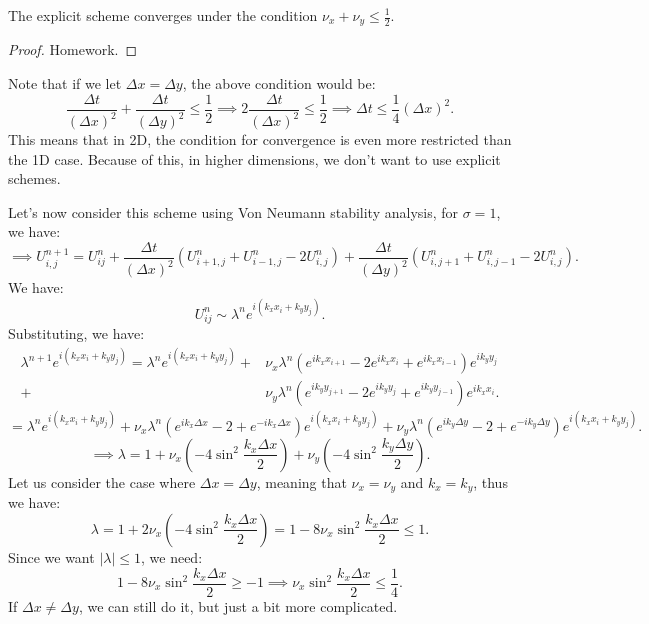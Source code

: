 \documentclass[../main/main.tex]{subfiles}
\begin{document}
\begin{theorem}
   The explicit scheme converges under the condition $\nu_x + \nu_y \le  \frac{1}{2}$. 
\end{theorem}
\begin{proof}
   Homework. 
\end{proof}

\begin{remark}
   Note that if we let $\Delta x= \Delta y$, the above condition would be:  \[
       \frac{\Delta t}{(\Delta x) ^2} + \frac{\Delta t}{(\Delta y) ^2} \le  \frac{1}{2} \implies 2 \frac{\Delta t}{(\Delta x)^2} \le  \frac{1}{2} \implies \Delta t \le  \frac{1}{4}(\Delta x)^2
   .\]   This means that in 2D, the condition for convergence is even more restricted than the 1D case. Because of this, in higher dimensions, we don't want to use explicit schemes.
\end{remark}

Let's now consider this scheme using Von Neumann stability analysis, for $\sigma = 1$, we have: \[ 
\implies U_{i,j}^{n+1} = U_{ij}^n + \frac{\Delta t}{(\Delta x)^2} \left( U_{i+1,j}^n + U_{i-1,j}^n - 2U_{i,j}^n \right) +\frac{\Delta t}{(\Delta y)^2} \left( U_{i,j+1}^n + U_{i,j-1}^n - 2U_{i,j}^n \right)  
.\] 
We have: \[
    U_{ij}^n \sim \lambda^n e^{i(k_x x_i + k_yy_j)}
.\] Substituting, we have:
\begin{align*}
    \lambda^{n+1} e^{i(k_x x_i + k_y y_j)} = \lambda^{n} e^{i(k_x x_i + k_y y_j)} + &\nu_x \lambda^n \left( e^{ik_x x_{i+1}} -2 e^{ik_x x_i} + e^{ik_x x_{i-1}} \right) e^{ik_y y_j} \\+ &\nu_y \lambda^n \left( e^{ik_y y_{j+1}} -2 e^{ik_y y_{j}} +e^{ik_y y_{j-1}} \right)  e^{ik_x x_i} 
.\end{align*}
 \[
= \lambda^{n}e^{i (k_x x_i + k_y y_j)} + \nu_x \lambda^n \left( e^{ik_x\Delta x} - 2 + e^{-ik_x \Delta x} \right) e^{i(k_x x_i + k_y y_j)}+ \nu_y \lambda^{n} \left( e^{ik_y \Delta y} - 2 + e^{-ik_y \Delta y} \right)  e^{i(k_x x_i + k_y y_j)}
.\] \[
\implies \lambda = 1 + \nu_x\left( -4 \sin^2 \frac{k_x \Delta x}{2}\right) + \nu_y \left( -4\sin^2 \frac{k_y \Delta y}{2}\right) 
.\] Let us consider the case where $\Delta x = \Delta y$, meaning that  $\nu_x = \nu_y$ and  $k_x = k_y$, thus we have:  \[
\lambda = 1+2\nu_x \left( -4 \sin^2 \frac{k_x \Delta x}{2} \right)  = 1-8 \nu_x \sin^2 \frac{k_x \Delta x}{2} \le  1
.\] Since we want $|\lambda|\le 1$, we need: \[
1 - 8 \nu_x \sin^2 \frac{k_x \Delta x}{2}\ge -1 \implies \nu_x \sin^2 \frac{k_x \Delta x}{2} \le  \frac{1}{4}
.\] If $\Delta x \neq \Delta y$, we can still do it, but just a bit more complicated.
\end{document}

